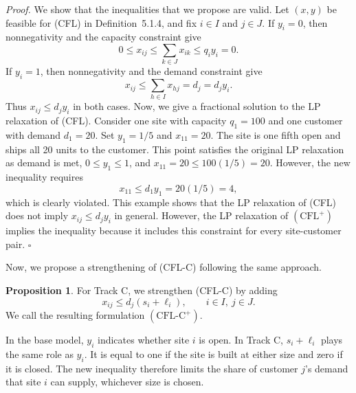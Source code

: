 \documentclass[11pt]{article}
\theoremstyle{definition}
\newtheorem{proposition}{Proposition}
\begin{document}
\begin{proofbox}
\emph{Proof.}
We show that the inequalities that we propose are valid. Let $(x,y)$ be feasible for (CFL) in Definition~5.1.4, and fix
$i\in I$ and $j\in J$. If $y_i=0$, then nonnegativity and the
capacity constraint give
\[
    0 \le x_{ij} \le \sum_{k\in J} x_{ik} \le q_i y_i = 0.
\]
If $y_i=1$, then nonnegativity and the demand constraint give
\[
    x_{ij} \le \sum_{h\in I} x_{hj} = d_j = d_j y_i.
\]
Thus $x_{ij}\le d_j y_i$ in both cases. Now, we give a fractional solution to the LP relaxation of (CFL). Consider one site with capacity $q_1=100$ and one customer with demand $d_1=20$. Set $y_1=1/5$ and $x_{11}=20$. The site is one fifth open and ships all 20 units to the customer. This point satisfies the original LP relaxation as demand is met, $0\le y_1\le 1$, and $x_{11}=20\le 100(1/5)=20$. However, the new inequality requires
\[
    x_{11} \le d_1 y_1 = 20(1/5)=4,
\]
which is clearly violated. This example shows that the LP relaxation of (CFL) does not imply $x_{ij}\le d_jy_i$ in general. However, the LP relaxation of $(\mathrm{CFL}^+)$ implies the inequality because it includes this constraint for every site-customer pair.
\hfill$\square$
\end{proofbox}
Now, we propose a strengthening of (CFL-C) following the same approach.
\begin{proposition}
For Track C, we strengthen (CFL-C) by adding
\[
    x_{ij} \le d_j(s_i+\ell_i), \qquad i\in I,\ j\in J.
\]
We call the resulting formulation $(\mathrm{CFL\text{-}C}^{+})$.
\end{proposition}

In the base model, $y_i$ indicates whether site $i$ is open.
In Track C, $s_i+\ell_i$ plays the same role as $y_i$. It is equal to one if the site is built at either size and zero if it is closed. The
new inequality therefore limits the share of customer $j$'s demand
that site $i$ can supply, whichever size is chosen.
\end{document}
